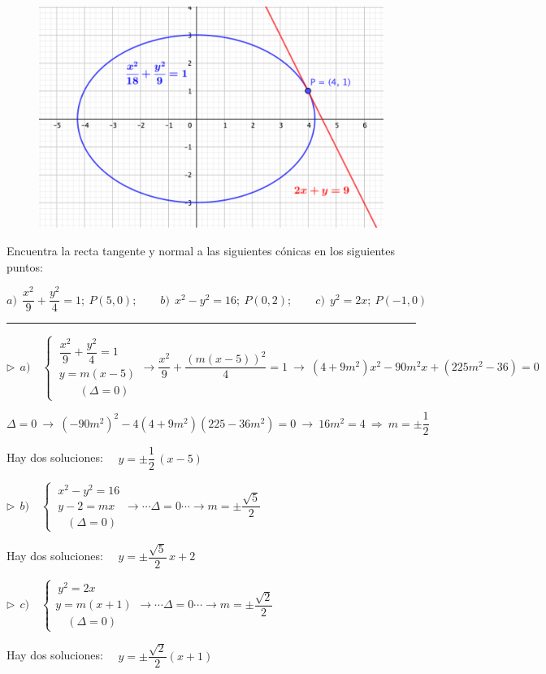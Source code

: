 \begin{figure}[H]
			\centering
			\includegraphics[width=.6\textwidth]{img-conicas/conicas44.png}
	\end{figure}

\begin{miejercicio}

Encuentra la recta tangente y normal a las siguientes cónicas en los siguientes puntos:

\vspace{2mm} $a)\ \ \dfrac{x^2}{9}+\dfrac{y^2}{4}=1	;\ P(5,0);\qquad b)\ \ x^2-y^2=16;\ P(0,2);\qquad c)\ \ y^2=2x;\ P(-1,0)$

\rule{250pt}{0.5pt}

\vspace{4mm} \begin{small} $\triangleright \ \ a)\quad \begin{cases} \ \dfrac{x^2}{9}+\dfrac{y^2}{4}=1 \\ \ y=m(x-5) \\ \qquad (\Delta=0) \end{cases} \to \dfrac{x^2}{9}+\dfrac{(m(x-5))^2}{4}=1	\ \to \ (4+9m^2)x^2-90m^2 x+(225m^2-36)=0$ \end{small}

\vspace{2mm} $\Delta = 0 \ \to \ (-90m^2)^2-4(4+9m^2)(225-36m^2)=0 \ \to \ 16m^2=4 \ \Rightarrow \ m=\pm \dfrac 1 2$

\vspace{2mm} Hay dos soluciones:  $\quad y=\pm \dfrac 1 2 \, (x-5)$

\vspace{4mm} $\triangleright \ \ b)\quad \begin{cases} \ x^2-y^2=16 \\ \ y-2=mx \\ \quad (\Delta=0) \end{cases} \to \cdots  \Delta=0 \cdots \to m=\pm \dfrac{\sqrt{5}}{2}$ 

\vspace{2mm} Hay dos soluciones: $\quad y=\pm \dfrac{\sqrt{5}}{2}\, x + 2$ 

\vspace{4mm} $\triangleright \ \ c)\quad \begin{cases} \ y^2=2x \\ y=m(x+1) \\ \quad (\Delta=0) \end{cases} \to \cdots  \Delta=0 \cdots \to m=\pm \dfrac{\sqrt{2}}{2}$ 
 

\vspace{2mm} Hay dos soluciones: $\quad y=\pm \dfrac{\sqrt{2}}{2}(x+1)$ 
\end{miejercicio}


